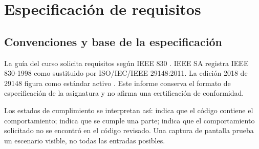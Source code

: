 \chapter{Especificación de requisitos}
\section{Convenciones y base de la especificación}
La guía del curso solicita requisitos según IEEE 830 \cite{guia}. IEEE SA registra IEEE 830-1998 como sustituido por ISO/IEC/IEEE 29148:2011. La edición 2018 de 29148 figura como estándar activo \cite{stand830,stand29148}. Este informe conserva el formato de especificación de la asignatura y no afirma una certificación de conformidad.

Los estados de cumplimiento se interpretan así:  indica que el código contiene el comportamiento;  indica que se cumple una parte;  indica que el comportamiento solicitado no se encontró en el código revisado. Una captura de pantalla prueba un escenario visible, no todas las entradas posibles.

